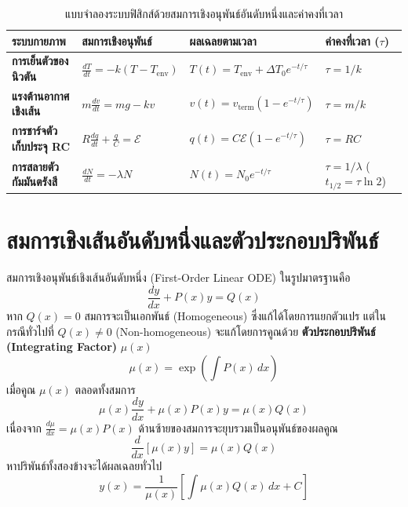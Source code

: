 \begin{table}[htbp]
    \centering
    \caption{แบบจำลองระบบฟิสิกส์ด้วยสมการเชิงอนุพันธ์อันดับหนึ่งและค่าคงที่เวลา}
    \label{tab:ode_physics_models}
    \begin{tabularx}{\textwidth}{p{3.2cm}p{3.4cm}p{4.2cm}Y}
        \toprule
        \textbf{ระบบกายภาพ} & \textbf{สมการเชิงอนุพันธ์} & \textbf{ผลเฉลยตามเวลา} & \textbf{ค่าคงที่เวลา ($\tau$)} \\
        \midrule
        \textbf{การเย็นตัวของนิวตัน} & $\frac{dT}{dt} = -k(T - T_{\text{env}})$ & $T(t) = T_{\text{env}} + \Delta T_0 e^{-t/\tau}$ & $\tau = 1/k$ \\
        \textbf{แรงต้านอากาศเชิงเส้น} & $m\frac{dv}{dt} = mg - kv$ & $v(t) = v_{\text{term}}(1 - e^{-t/\tau})$ & $\tau = m/k$ \\
        \textbf{การชาร์จตัวเก็บประจุ RC} & $R\frac{dq}{dt} + \frac{q}{C} = \mathcal{E}$ & $q(t) = C\mathcal{E}(1 - e^{-t/\tau})$ & $\tau = RC$ \\
        \textbf{การสลายตัวกัมมันตรังสี} & $\frac{dN}{dt} = -\lambda N$ & $N(t) = N_0 e^{-t/\tau}$ & $\tau = 1/\lambda$ ($t_{1/2} = \tau\ln 2$) \\
        \bottomrule
    \end{tabularx}
\end{table}

\section{สมการเชิงเส้นอันดับหนึ่งและตัวประกอบปริพันธ์}
สมการเชิงอนุพันธ์เชิงเส้นอันดับหนึ่ง (First-Order Linear ODE) ในรูปมาตรฐานคือ
\begin{equation}
\frac{dy}{dx} + P(x)y = Q(x)
\end{equation}
หาก $Q(x) = 0$ สมการจะเป็นเอกพันธ์ (Homogeneous) ซึ่งแก้ได้โดยการแยกตัวแปร แต่ในกรณีทั่วไปที่ $Q(x) \neq 0$ (Non-homogeneous) จะแก้โดยการคูณด้วย \textbf{ตัวประกอบปริพันธ์ (Integrating Factor)} $\mu(x)$
\begin{equation}
\mu(x) = \exp\left(\int P(x)\,dx\right)
\end{equation}
เมื่อคูณ $\mu(x)$ ตลอดทั้งสมการ
\begin{equation}
\mu(x)\frac{dy}{dx} + \mu(x)P(x)y = \mu(x)Q(x)
\end{equation}
เนื่องจาก $\frac{d\mu}{dx} = \mu(x)P(x)$ ด้านซ้ายของสมการจะยุบรวมเป็นอนุพันธ์ของผลคูณ
\begin{equation}
\frac{d}{dx}\left[\mu(x)y\right] = \mu(x)Q(x)
\end{equation}
หาปริพันธ์ทั้งสองข้างจะได้ผลเฉลยทั่วไป
\begin{equation}
y(x) = \frac{1}{\mu(x)}\left[\int \mu(x)Q(x)\,dx + C\right]
\end{equation}

